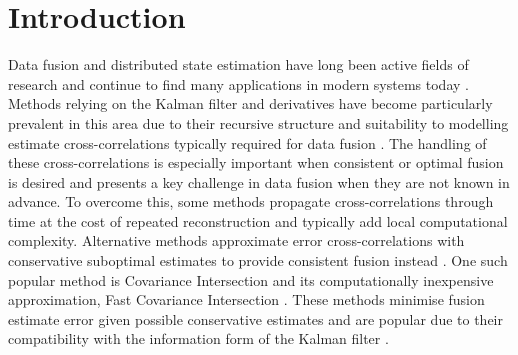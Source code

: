 \documentclass[letterpaper, 10 pt, conference]{ieeeconf}
\begin{document}
\section{Introduction}\label{sec:introduction}
Data fusion and distributed state estimation have long been active fields of research and continue to find many applications in modern systems today \cite{andersonOptimalFiltering1979,simonOptimalStateEstimation2006}. Methods relying on the Kalman filter and derivatives \cite{haugBayesianEstimationTracking2012} have become particularly prevalent in this area due to their recursive structure and suitability to modelling estimate cross-correlations typically required for data fusion \cite{mutambaraDecentralizedEstimationControl1998,ligginsDistributedDataFusion2012}. The handling of these cross-correlations is especially important when consistent or optimal fusion is desired \cite{bar-shalomTracktotrackCorrelationProblem1981,sunMultisensorOptimalInformation2004} and presents a key challenge in data fusion when they are not known in advance. To overcome this, some methods propagate cross-correlations through time at the cost of repeated reconstruction \cite{steinbringOptimalSamplebasedFusion2016,radtkeReconstructionCrossCorrelationsConstant2018,radtkeFullyDecentralizedEstimationUsing2021} and typically add local computational complexity. Alternative methods approximate error cross-correlations with conservative suboptimal estimates to provide consistent fusion instead \cite{julierNondivergentEstimationAlgorithm1997,noackDecentralizedDataFusion2017,niehsenInformationFusionBased2002}. One such popular method is Covariance Intersection \cite{julierNondivergentEstimationAlgorithm1997} and its computationally inexpensive approximation, Fast Covariance Intersection \cite{niehsenInformationFusionBased2002}. These methods minimise fusion estimate error given possible conservative estimates and are popular due to their compatibility with the information form of the Kalman filter \cite{mutambaraDecentralizedEstimationControl1998,pfaffInformationFormDistributed2017}.
\end{document}
